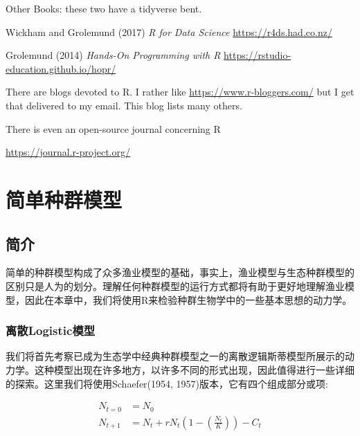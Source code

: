 \documentclass[
  lang=cn,
  11pt,
  scheme=chinese,
  chinesefont=nofont,
  citestyle=gb7714-2015,
  bibstyle=gb7714-2015]{elegantbook}
\begin{document}
Other Books: these two have a tidyverse bent.

Wickham and Grolemund (2017) \emph{R for Data Science} \url{https://r4ds.had.co.nz/}

Grolemund (2014) \emph{Hands-On Programming with R} \url{https://rstudio-education.github.io/hopr/}

There are blogs devoted to R. I rather like \url{https://www.r-bloggers.com/} but I get that delivered to my email. This blog lists many others.

There is even an open-source journal concerning R

\url{https://journal.r-project.org/}

\chapter{简单种群模型}\label{ux7b80ux5355ux79cdux7fa4ux6a21ux578b}

\section{简介}\label{ux7b80ux4ecb-2}

简单的种群模型构成了众多渔业模型的基础，事实上，渔业模型与生态种群模型的区别只是人为的划分。理解任何种群模型的运行方式都将有助于更好地理解渔业模型，因此在本章中，我们将使用R来检验种群生物学中的一些基本思想的动力学。

\subsection{离散Logistic模型}\label{ux79bbux6563logisticux6a21ux578b}

我们将首先考察已成为生态学中经典种群模型之一的离散逻辑斯蒂模型所展示的动力学。这种模型出现在许多地方，以许多不同的形式出现，因此值得进行一些详细的探索。这里我们将使用Schaefer(1954, 1957)版本，它有四个组成部分或项:

\begin{equation}
\begin{split}  
N_{t=0} &= N_0 \\  
{{N}_{t+1}} &= {{N}_{t}}+{{r}{N}_{t}}\left( 1-{{\left( \frac{{{N}_{t}}}{K} \right)}} \right)-{{C}_{t}}  
\end{split}  
\label{eq:eq31}
\end{equation}
\end{document}
